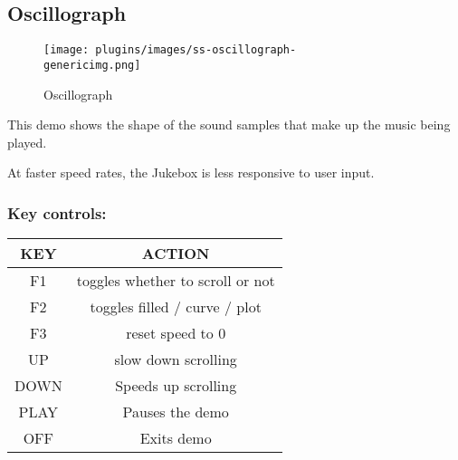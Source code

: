 \subsection{Oscillograph}
\begin{figure}[h!]
\begin{center}
\texttt{[image: plugins/images/ss-oscillograph-\\genericimg.png]}
\end{center}
\caption{Oscillograph}
\end{figure}

This demo shows the shape of the sound samples that make up the music
being played.

At faster speed rates, the Jukebox is less responsive to user input.

\subsubsection{Key controls:}

\begin{table}[h!]
\begin{center}
\begin{tabular}{|c|c|}
\hline
KEY & ACTION \\\hline
F1 & toggles whether to scroll or not \\\hline
F2 & toggles filled / curve / plot \\\hline
F3 & reset speed to 0 \\\hline
UP & slow down scrolling \\\hline
DOWN & Speeds up scrolling \\\hline
PLAY & Pauses the demo \\\hline
OFF & Exits demo \\\hline
\end{tabular}
\end{center}
\end{table}

